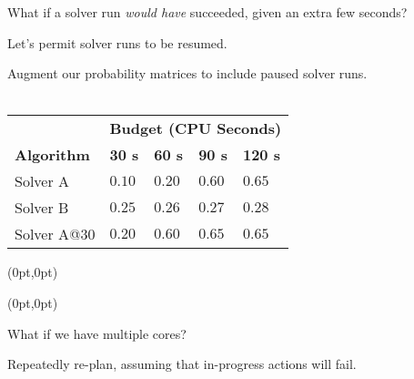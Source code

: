 \begin{frame}
What if a solver run \emph{would have} succeeded, given an extra few seconds?

Let's permit solver runs to be resumed.
\end{frame}

\begin{frame}
Augment our probability matrices to include paused solver runs.
\ \\
\ \\
\begin{center}
\begin{tabular}{lllll}
\toprule
& \multicolumn{4}{l}{{\bf Budget (CPU Seconds)}}\\
\cmidrule{2-5}
{\bf Algorithm} & {\bf 30 s} & {\bf 60 s} & {\bf 90 s} & {\bf 120 s}\\
\midrule
Solver A & $0.10$ & $0.20$ & $0.60$ & $0.65$\\
Solver B & $0.25$ & $0.26$ & $0.27$ & $0.28$\\
Solver A@30 & $0.20$ & $0.60$ & $0.65$ & $0.65$\\
\bottomrule
\end{tabular}
\end{center}
\end{frame}

\begin{frame}
\begin{textblock*}{5in}(0pt,0pt)

\end{textblock*}
\end{frame}

\begin{frame}
\begin{textblock*}{5in}(0pt,0pt)

\end{textblock*}
\end{frame}

\begin{frame}
What if we have multiple cores?

Repeatedly re-plan, assuming that in-progress actions will fail.
\end{frame}

